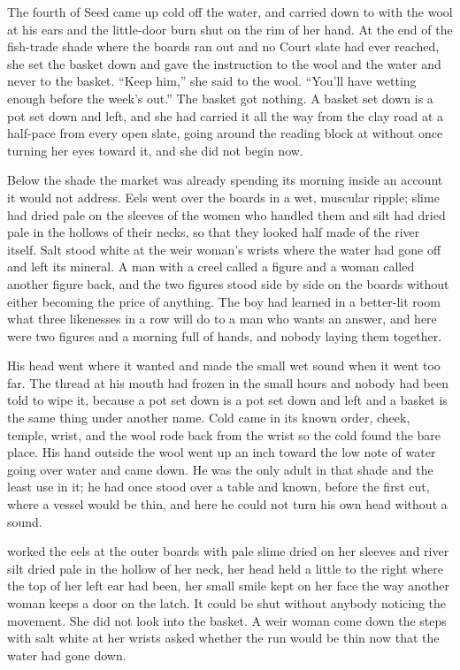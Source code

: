 
The fourth of Seed came up cold off the water, and  carried  down to  with the wool at his ears and the little-door burn shut on the rim of her hand. At the end of the fish-trade shade where the boards ran out and no Court slate had ever reached, she set the basket down and gave the instruction to the wool and the water and never to the basket. “Keep him,” she said to the wool. “You'll have wetting enough before the week's out.” The basket got nothing. A basket set down is a pot set down and left, and she had carried it all the way from the clay road at a half-pace from every open slate, going around the reading block at  without once turning her eyes toward it, and she did not begin now.

Below the shade the market was already spending its morning inside an account it would not address. Eels went over the boards in a wet, muscular ripple; slime had dried pale on the sleeves of the women who handled them and silt had dried pale in the hollows of their necks, so that they looked half made of the river itself. Salt stood white at the weir woman's wrists where the water had gone off and left its mineral. A man with a creel called a figure and a woman called another figure back, and the two figures stood side by side on the boards without either becoming the price of anything. The boy had learned in a better-lit room what three likenesses in a row will do to a man who wants an answer, and here were two figures and a morning full of hands, and nobody laying them together.

His head went where it wanted and made the small wet sound when it went too far. The thread at his mouth had frozen in the small hours and nobody had been told to wipe it, because a pot set down is a pot set down and left and a basket is the same thing under another name. Cold came in its known order, cheek, temple, wrist, and the wool rode back from the wrist so the cold found the bare place. His hand outside the wool went up an inch toward the low note of water going over water and came down. He was the only adult in that shade and the least use in it; he had once stood over a table and known, before the first cut, where a vessel would be thin, and here he could not turn his own head without a sound.

 worked the eels at the outer boards with pale slime dried on her sleeves and river silt dried pale in the hollow of her neck, her head held a little to the right where the top of her left ear had been, her small smile kept on her face the way another woman keeps a door on the latch. It could be shut without anybody noticing the movement. She did not look into the basket. A weir woman come down the steps with salt white at her wrists asked whether the run would be thin now that the water had gone down.


